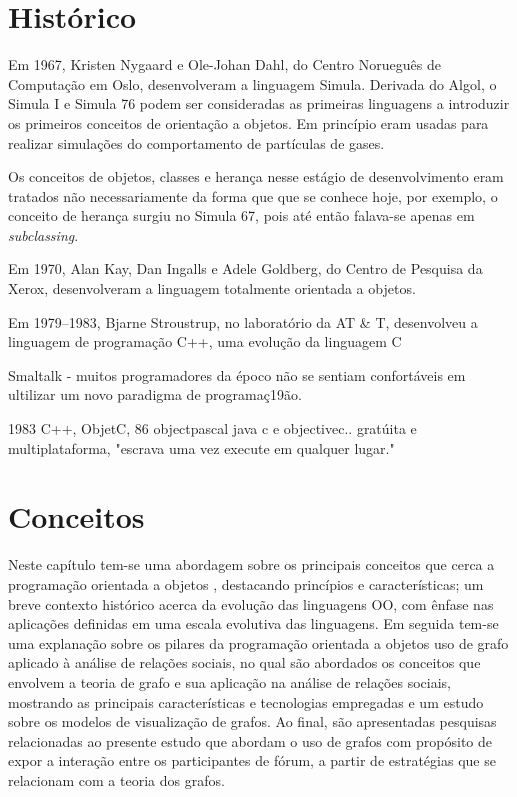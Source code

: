 \documentclass[11pt,a4paper]{article}
\begin{document}

\section{Histórico}

Em 1967, Kristen Nygaard e Ole-Johan Dahl, do Centro Norueguês de Computação em Oslo, desenvolveram a linguagem Simula. Derivada do Algol, o Simula I e Simula 76 podem ser consideradas as primeiras linguagens a introduzir os primeiros conceitos de orientação a objetos. Em princípio eram usadas para realizar simulações do comportamento de partículas de gases.

Os conceitos de objetos, classes e herança nesse estágio de desenvolvimento eram tratados não necessariamente da forma que que se conhece hoje, por exemplo, o conceito de herança surgiu no Simula 67, pois até então falava-se apenas em \textit{subclassing}.

Em 1970, Alan Kay, Dan Ingalls e Adele Goldberg, do Centro de Pesquisa da Xerox, desenvolveram a linguagem totalmente orientada a objetos.

Em 1979–1983, Bjarne Stroustrup, no laboratório da AT \& T, desenvolveu a linguagem de programação C++, uma evolução da linguagem C

Smaltalk - muitos programadores da époco não se sentiam confortáveis em ultilizar um novo paradigma de programaç19ão.

1983 C++, ObjetC, 86 objectpascal java c e objectivec.. gratúita e multiplataforma, "escrava uma vez execute em qualquer lugar."

% 



\vspace{0.3in}

\section{Conceitos}
Neste capítulo tem-se uma abordagem sobre os principais conceitos que cerca a programação orientada a objetos , destacando princípios e características; um breve contexto histórico
acerca da evolução das linguagens OO, com ênfase nas aplicações definidas em uma escala evolutiva das linguagens. Em seguida tem-se uma explanação sobre os pilares da programação orientada a objetos  uso de grafo aplicado à
análise de relações sociais, no qual são abordados os conceitos que envolvem
a teoria de grafo e sua aplicação na análise de relações sociais, mostrando as
principais características e tecnologias empregadas e um estudo sobre os modelos
de visualização de grafos. Ao final, são apresentadas pesquisas relacionadas ao
presente estudo que abordam o uso de grafos com propósito de expor a interação
entre os participantes de fórum, a partir de estratégias que se relacionam com a
teoria dos grafos.
\end{document}
